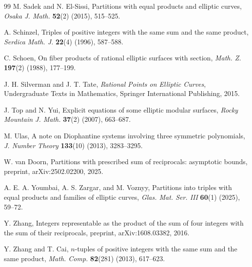 \documentclass[10pt]{article}
\begin{document}
\begin{thebibliography}{99}
M. Sadek and N. El-Sissi, Partitions with equal products and elliptic curves, \textit{Osaka J. Math.} \textbf{52}(2) (2015), 515--525.

A. Schinzel, Triples of positive integers with the same sum and the same product, \textit{Serdica Math. J.} \textbf{22}(4) (1996), 587--588.

C. Schoen, On fiber products of rational elliptic surfaces with section, \textit{Math. Z.} \textbf{197}(2) (1988), 177--199.

J. H. Silverman and J. T. Tate, \textit{Rational Points on Elliptic Curves}, Undergraduate Texts in Mathematics, Springer International Publishing, 2015.

J. Top and N. Yui, Explicit equations of some elliptic modular surfaces, \textit{Rocky Mountain J. Math.} \textbf{37}(2) (2007), 663--687.

M. Ulas, A note on Diophantine systems involving three symmetric polynomials, \textit{J. Number Theory} \textbf{133}(10) (2013), 3283--3295.

W. van Doorn, Partitions with prescribed sum of reciprocals: asymptotic bounds, preprint, arXiv:2502.02200, 2025.

A. E. A. Youmbai, A. S. Zargar, and M. Voznyy, Partitions into triples with equal products and families of elliptic curves, \textit{Glas. Mat. Ser. III} \textbf{60}(1) (2025), 59--72.

Y. Zhang, Integers representable as the product of the sum of four integers with the sum of their reciprocals, preprint, arXiv:1608.03382, 2016.

Y. Zhang and T. Cai, $n$-tuples of positive integers with the same sum and the same product, \textit{Math. Comp.} \textbf{82}(281) (2013), 617--623.

\end{thebibliography}
\end{document}
